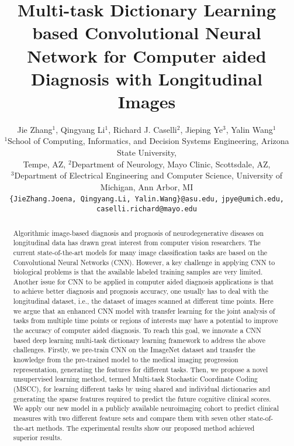 \documentclass[10pt,twocolumn,letterpaper]{article}
\begin{document}
\title{Multi-task Dictionary Learning based Convolutional Neural Network for Computer aided Diagnosis with Longitudinal Images}

\author{Jie Zhang$^1$, Qingyang Li$^1$, Richard J. Caselli$^2$, Jieping Ye$^3$, Yalin Wang$^1$\\
$^1$School of Computing, Informatics, and Decision Systems Engineering, Arizona State University, \\Tempe, AZ, $^2$Department of Neurology, Mayo Clinic, Scottsdale, AZ, \\$^3$Department of Electrical Engineering and Computer Science, University of Michigan, Ann Arbor, MI\\
{\tt\small \{JieZhang.Joena, Qingyang.Li, Yalin.Wang\}@asu.edu,}
{\tt\small jpye@umich.edu,}
{\tt\small caselli.richard@mayo.edu}
}
\maketitle

\begin{abstract}
Algorithmic image-based diagnosis and prognosis of neurodegenerative diseases on longitudinal data has drawn great interest from computer vision researchers. The current state-of-the-art models for many image classification tasks are based on the Convolutional Neural Networks (CNN). However, a key challenge in applying CNN to biological problems is that the available labeled training samples are very limited. Another issue for CNN to be applied in computer aided diagnosis applications is that to achieve better diagnosis and prognosis accuracy, one usually has to deal with the longitudinal dataset,  i.e., the dataset of images scanned at different time points. Here we argue that an enhanced CNN model with transfer learning for the joint analysis of tasks from multiple time points or regions of interests may have a potential to improve the accuracy of computer aided diagnosis. To reach this goal, we innovate a CNN based deep learning multi-task dictionary learning framework to address the above challenges. Firstly, we pre-train CNN on the ImageNet dataset and transfer the knowledge from the pre-trained model to the medical imaging progression representation, generating the features for different tasks. Then, we propose a novel unsupervised learning method, termed Multi-task Stochastic Coordinate Coding (MSCC), for learning different tasks by using shared and individual dictionaries and generating the sparse features required to predict the future cognitive clinical scores. We apply our new model in a publicly available neuroimaging cohort to predict clinical measures with two different feature sets and compare them with seven other state-of-the-art methods. The experimental results show our proposed method achieved superior results.
\end{abstract}
\end{document}
